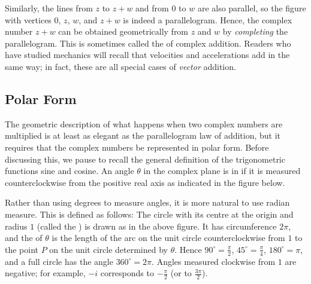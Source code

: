 \documentclass{ximera}
\begin{document}
Similarly, the lines from $z$ to $z + w$ and from $0$ to $w$ are also parallel, so the figure with vertices $0$, $z$, $w$, and $z + w$ is indeed a parallelogram. Hence, the complex number $z + w$ can be obtained geometrically from $z$ and $w$ by \textit{completing} the parallelogram. This is sometimes called the 
 of complex addition. Readers who have studied mechanics will recall
that velocities and accelerations add in the same way; in fact, these
are all special cases of \textit{vector} addition.

\subsection*{Polar Form}
The geometric description of what
happens when two complex numbers are multiplied is at least as elegant
as the parallelogram law of addition, but it requires that the complex
numbers be represented in polar form. Before discussing this, we pause
to recall the general definition of the trigonometric functions sine and
 cosine. An angle $\theta$ in the complex plane is in  if it is measured counterclockwise from the positive real axis as indicated in the figure below.



\begin{center}
 \end{center}

 
 Rather than using degrees to measure angles, it is more natural to use
radian measure. This is defined as follows: The circle with its centre
at the origin and radius $1$ (called the ) is drawn as in the above figure. It has circumference $2\pi$, and the  of $\theta$ is the length of the arc on the unit circle counterclockwise from $1$ to the point $P$ on the unit circle determined by $\theta$. Hence $90^{\circ} = \frac{\pi}{2}$, $45^{\circ}  = \frac{\pi}{4}$, $180^{\circ}  = \pi$, and a full circle has the angle $360^{\circ}  = 2\pi$. Angles measured clockwise from $1$ are negative; for example, $-i$ corresponds to $-\frac{\pi}{2}$ (or to $\frac{3\pi}{2}$).
\end{document}

